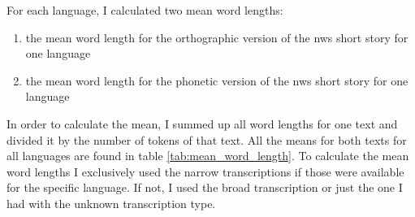 \begin{description}[style=unboxed]
\item[\textsc{3. step - Calculating mean word lengths}:] For each language, I calculated two mean word lengths:
\begin{enumerate}
    \item the mean word length for the orthographic version of the \ac{nws} short story for one language
    \item the mean word length for the phonetic version of the \ac{nws} short story for one language
\end{enumerate}
 In order to calculate the mean, I summed up all word lengths for one text and divided it by the number of tokens of that text. All the means for both texts for all languages are found in table \ref{tab:mean_word_length}. To calculate the mean word lengths I exclusively used the narrow transcriptions if those were available for the specific language. If not, I used the broad transcription or just the one I had with the unknown transcription type. 


\end{description}
